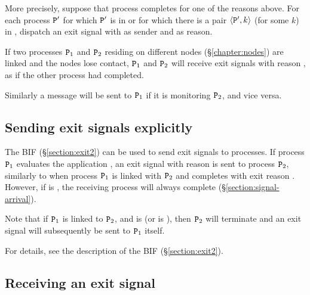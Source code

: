 More precisely, suppose that process  completes for one of the reasons above.
For each process ${\tt{\sl P}}'$ for which ${\tt{\sl P}}'$ is in \ifNew
or for which there is a pair $\langle{\tt{\sl P}}',k\rangle$ (for some $k$) in
\fi,
dispatch an exit signal with  as sender and  as reason.

If two processes ${\tt{\sl P}}_1$ and ${\tt{\sl P}}_2$ residing on different nodes
(\S\ref{chapter:nodes})
are linked and the nodes lose contact, ${\tt{\sl P}}_1$ and ${\tt{\sl P}}_2$ will receive
exit signals with reason , as if the other process had completed.

\ifNew
{}
Similarly a message  will be sent to ${\tt{\sl P}}_1$ if it is
monitoring ${\tt{\sl P}}_2$, and vice versa.
\fi
{}

\subsection{Sending exit signals explicitly}

\label{section:sending-exit-signal}

The BIF  (\S\ref{section:exit2}) can be used to send
exit signals to processes.
If process ${\tt{\sl P}}_1$ evaluates the application ,
an exit signal with reason  is sent to process ${\tt{\sl P}}_2$, similarly to
when process ${\tt{\sl P}}_1$ is linked with ${\tt{\sl P}}_2$ and
completes with exit reason .
However, if  is ,
the receiving process will always
complete (\S\ref{section:signal-arrival}).

Note that if ${\tt{\sl P}}_1$ is linked to ${\tt{\sl P}}_2$,
and  is 
(or  is ),
then ${\tt{\sl P}}_2$ will
terminate and an exit signal
will subsequently be sent to ${\tt{\sl P}}_1$ itself.

For details, see the description of the BIF
 (\S\ref{section:exit2}).

\subsection{Receiving an exit signal}

